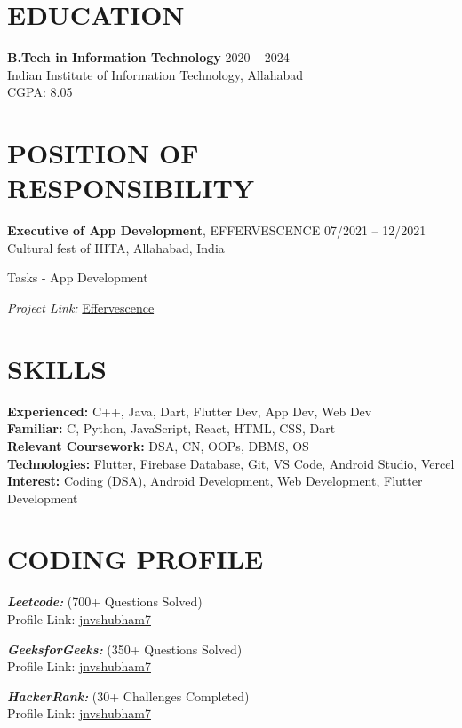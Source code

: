\documentclass[10pt, letterpaper]{article}
\begin{document}
\section{EDUCATION}

\textbf{B.Tech in Information Technology} \hfill 2020 -- 2024 \\
Indian Institute of Information Technology, Allahabad \\
CGPA: 8.05

\section{POSITION OF RESPONSIBILITY}

\textbf{Executive of App Development}, EFFERVESCENCE \hfill 07/2021 -- 12/2021 \\
Cultural fest of IIITA, Allahabad, India \\
\begin{highlightsforbulletentries}
    \item Tasks - App Development
    \item \textit{Project Link:} \href{https://github.com/jnvshubham7/Effervescence_21_CA}{Effervescence}
\end{highlightsforbulletentries}

\section{SKILLS}

\textbf{Experienced:} C++, Java, Dart, Flutter Dev, App Dev, Web Dev \\[0.5em]
\textbf{Familiar:} C, Python, JavaScript, React, HTML, CSS, Dart \\[0.5em]
\textbf{Relevant Coursework:} DSA, CN, OOPs, DBMS, OS \\[0.5em]
\textbf{Technologies:} Flutter, Firebase Database, Git, VS Code, Android Studio, Vercel \\[0.5em]
\textbf{Interest:} Coding (DSA), Android Development, Web Development, Flutter Development

\section{CODING PROFILE}

\textit{\textbf{Leetcode:}} (700+ Questions Solved) \\
Profile Link: \href{https://leetcode.com/jnvshubham7/}{jnvshubham7}

\vspace{1em}

\textit{\textbf{GeeksforGeeks:}} (350+ Questions Solved) \\
Profile Link: \href{https://auth.geeksforgeeks.org/user/jnvshubham7/profile}{jnvshubham7}

\vspace{1em}

\textit{\textbf{HackerRank:}} (30+ Challenges Completed) \\
Profile Link: \href{https://www.hackerrank.com/jnvshubham7}{jnvshubham7}
\end{document}
